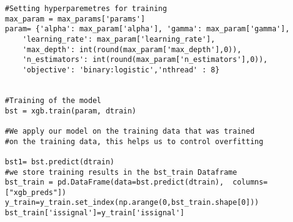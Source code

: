 \begin{lstlisting}
#Setting hyperparemetres for training
max_param = max_params['params']
param= {'alpha': max_param['alpha'], 'gamma': max_param['gamma'], 
    'learning_rate': max_param['learning_rate'],
    'max_depth': int(round(max_param['max_depth'],0)),
    'n_estimators': int(round(max_param['n_estimators'],0)),
    'objective': 'binary:logistic','nthread' : 8}


#Training of the model
bst = xgb.train(param, dtrain)

#We apply our model on the training data that was trained 
#on the training data, this helps us to control overfitting
    
bst1= bst.predict(dtrain)
#we store training results in the bst_train Dataframe
bst_train = pd.DataFrame(data=bst.predict(dtrain),  columns=["xgb_preds"])
y_train=y_train.set_index(np.arange(0,bst_train.shape[0]))
bst_train['issignal']=y_train['issignal']

\end{lstlisting}